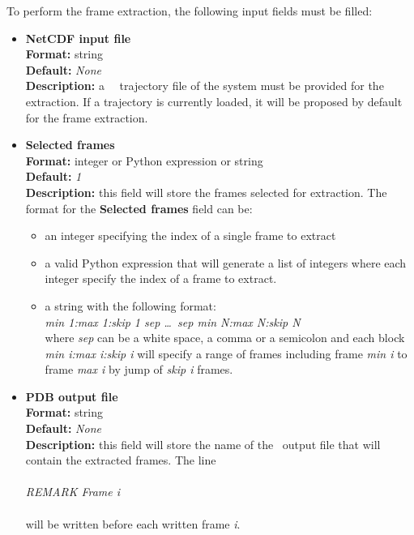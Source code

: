 \documentclass[a4paper,11pt]{report}
\begin{document}
To perform the frame extraction, the following input fields must be filled:
\hypertarget{frame_snapshot_mmtk_trajectory_file}{}
\begin{itemize}
\item \textbf{NetCDF input file}\\
\textbf{Format:} string\\
\textbf{Default:} \textit{None}\\
\textbf{Description:} a \MMTK\ \NetCDF\ trajectory file of the system must be provided for the extraction. 
If a trajectory is currently loaded, it will be proposed by default for the frame extraction.

\hypertarget{frame_snapshot_selected_frame}{}
\item \textbf{Selected frames}\\
\textbf{Format:} integer or Python expression or string\\
\textbf{Default:} \textit{1}\\
\textbf{Description:} this field will store the frames selected for extraction. The format for the \textbf{Selected frames} 
field can be:
\begin{itemize}
\item an integer specifying the index of a single frame to extract
\item a valid Python expression that will generate a list of integers where each integer specify the index of a frame to extract.
\item a string with the following format:\\
\textit{min 1:max 1:skip 1 sep \ldots\ sep min N:max N:skip N}\\
where \textit{sep} can be a white space, a comma or a semicolon and each block \textit{min i:max i:skip i} will specify a 
range of frames including frame \textit{min i} to frame \textit{max i} by jump of \textit{skip i} frames.
\end{itemize}

\hypertarget{frame_snapshot_pdb_output_file}{}
\item \textbf{PDB output file}\\
\textbf{Format:} string\\
\textbf{Default:} \textit{None}\\
\textbf{Description:} this field will store the name of the \PDB\ output file that will contain the extracted frames. The line
\\\\
\textit{REMARK Frame i}
\\\\
will be written before each written frame \textit{i}.
\end{itemize}
\end{document}
